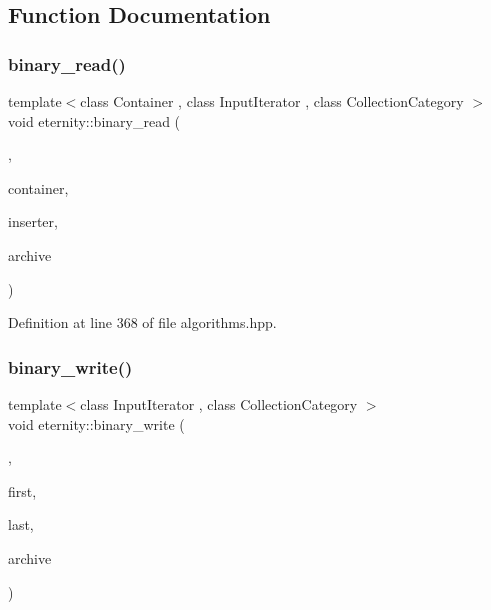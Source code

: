 \subsection{Function Documentation}
\mbox{\label{namespaceeternity_a4bd77f03b6e8ea105a1b7a8d4e245fbe}} 
\subsubsection{\texorpdfstring{binary\+\_\+read()}{binary\_read()}}
{\footnotesize\ttfamily template$<$class Container , class Input\+Iterator , class Collection\+Category $>$ \\
void eternity\+::binary\+\_\+read (\begin{DoxyParamCaption}\item[{Collection\+Category}]{,  }\item[{Container \&}]{container,  }\item[{Input\+Iterator}]{inserter,  }\item[{\hyperlink{classeternity_1_1bin__archive}{bin\+\_\+archive} \&}]{archive }\end{DoxyParamCaption})}



Definition at line 368 of file algorithms.\+hpp.

\mbox{\label{namespaceeternity_a60ba54c971ad5c7de37fa57de8b3fd4c}} 
\subsubsection{\texorpdfstring{binary\+\_\+write()}{binary\_write()}}
{\footnotesize\ttfamily template$<$class Input\+Iterator , class Collection\+Category $>$ \\
void eternity\+::binary\+\_\+write (\begin{DoxyParamCaption}\item[{Collection\+Category}]{,  }\item[{Input\+Iterator}]{first,  }\item[{Input\+Iterator}]{last,  }\item[{\hyperlink{classeternity_1_1bin__archive}{bin\+\_\+archive} \&}]{archive }\end{DoxyParamCaption})}



